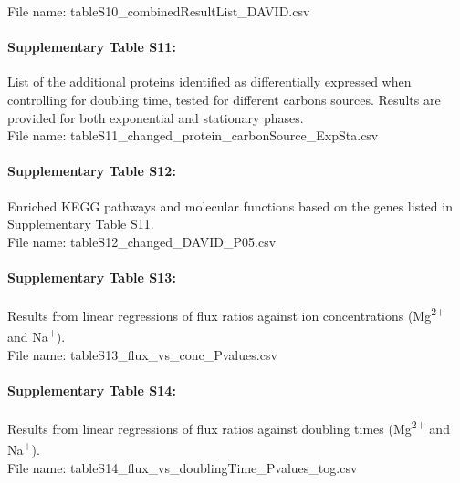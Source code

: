 \documentclass[a4paper]{article}
\begin{document}
\noindent File name: tableS10\_combinedResultList\_DAVID.csv

\paragraph*{Supplementary Table S11:} List of the additional proteins identified as differentially expressed when controlling for doubling time, tested for different carbons sources. Results are provided for both exponential and stationary phases.\\

\noindent File name: tableS11\_changed\_protein\_carbonSource\_ExpSta.csv


\paragraph*{Supplementary Table S12:} Enriched KEGG pathways and molecular functions based on the genes listed in Supplementary Table S11.\\

\noindent File name: tableS12\_changed\_DAVID\_P05.csv

\paragraph*{Supplementary Table S13:} Results from linear regressions of flux ratios against ion concentrations (Mg\textsuperscript{2+} and Na\textsuperscript{+}).\\

\noindent File name: tableS13\_flux\_vs\_conc\_Pvalues.csv


\paragraph*{Supplementary Table S14:} Results from linear regressions of flux ratios against doubling times (Mg\textsuperscript{2+} and Na\textsuperscript{+}).\\

\noindent File name: tableS14\_flux\_vs\_doublingTime\_Pvalues\_tog.csv
\end{document}
